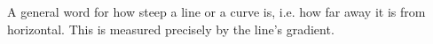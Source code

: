 A general word for how steep a line or a curve is, i.e. how far away
it is from horizontal. This is measured precisely by the line's
gradient.